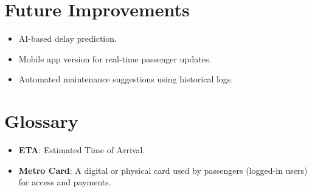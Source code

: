 \documentclass[12pt]{article}
\begin{document}
\section{Future Improvements}
\begin{itemize}[noitemsep]
  \item AI-based delay prediction.
  \item Mobile app version for real-time passenger updates.
  \item Automated maintenance suggestions using historical logs.
\end{itemize}

\section{Glossary}
\begin{itemize}[noitemsep]
  \item \textbf{ETA}: Estimated Time of Arrival.
  \item \textbf{Metro Card}: A digital or physical card used by passengers (logged-in users) for access and payments.
\end{itemize}
\end{document}
